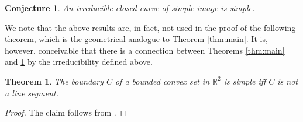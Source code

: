 \documentclass{amsart}
\newtheorem{theorem}[proposition]{Theorem}
\newtheorem{conjecture}[proposition]{Conjecture}
\theoremstyle{definition}
\theoremstyle{remark}
\begin{document}
\begin{conjecture}
    \label{con:irr_simple}
    An irreducible closed curve of simple image is simple.
\end{conjecture}

We note that the above results are, in fact,
not used in the proof of the following theorem, which is the
geometrical analogue to Theorem \ref{thm:main}. It is, however,
conceivable that there is a connection between Theorems
\ref{thm:main} and \ref{thm:main_geo} by the irreducibility
defined above.

\begin{theorem}
    \label{thm:main_geo}
    The boundary $C$ of a bounded convex set in $\mathbb{R}^2$
    is simple iff $C$ is not a line segment.
\end{theorem}

\begin{proof}
    The claim follows from \cite[Proposition 28 and Theorem 32]{lrs}.
\end{proof}





\end{document}
